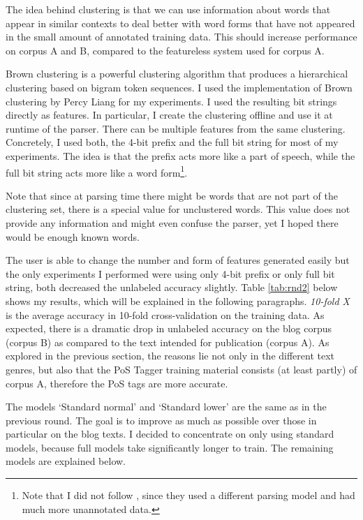 \documentclass[11pt,letterpaper, covington]{article}
\begin{document}
The idea behind clustering is that we can use information about words that appear in similar contexts to deal better with word forms that have not appeared in the small amount of annotated training data. This should increase performance on corpus A and B, compared to the featureless system used for corpus A.

Brown clustering \citep{BSMPL92} is a powerful clustering algorithm that produces a hierarchical clustering based on bigram token sequences. I used the implementation of Brown clustering by Percy Liang \citep{liang05} for my experiments. I used the resulting bit strings directly as features. In particular, I create the clustering offline and use it at runtime of the parser. There can be multiple features from the same clustering. Concretely, I used both, the 4-bit prefix and the full bit string for most of my experiments. The idea is that the prefix acts more like a part of speech, while the full bit string acts more like a word form\citep{KCC08}\footnote{Note that I did not follow \citet{KCC08}, since they used a different parsing model and had much more unannotated data.}.

Note that since at parsing time there might be words that are not part of the clustering set, there is a special value for unclustered words. This value does not provide any information and might even confuse the parser, yet I hoped there would be enough known words.

The user is able to change the number and form of features generated easily but the only experiments I performed were using only 4-bit prefix or only full bit string, both decreased the unlabeled accuracy slightly. Table \ref{tab:rnd2} below shows my results, which will be explained in the following paragraphs. \emph{10-fold X} is the average accuracy in 10-fold cross-validation on the training data. As expected, there is a dramatic drop in unlabeled accuracy on the blog corpus (corpus B) as compared to the text intended for publication (corpus A). As explored in the previous section, the reasons lie not only in the different text genres, but also that the PoS Tagger training material consists (at least partly) of corpus A, therefore the PoS tags are more accurate. 

The models `Standard normal' and `Standard lower' are the same as in the previous round. The goal is to improve as much as possible over those in particular on the blog texts. I decided to concentrate on only using standard models, because full models take significantly longer to train. The remaining models are explained below.
\end{document}

